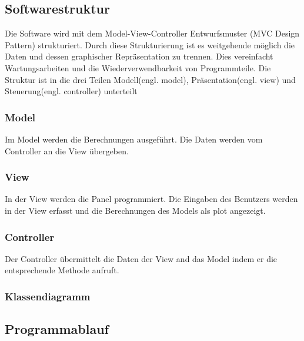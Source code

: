 \newpage

\subsection{Softwarestruktur} \label{subsec:softwarestruktur}

Die Software wird mit dem Model-View-Controller Entwurfsmuster (MVC Design Pattern) \cite{MVCDesignPattern} strukturiert. Durch diese Strukturierung ist es weitgehende möglich die Daten und dessen graphischer Repräsentation zu trennen. Dies vereinfacht Wartungsarbeiten und die Wiederverwendbarkeit von Programmteile. Die Struktur ist in die drei Teilen Modell(engl. model), Präsentation(engl. view) und Steuerung(engl. controller) unterteilt

\subsubsection{Model} \label{subsubsec:model}

Im Model werden die Berechnungen ausgeführt. Die Daten werden vom Controller an die View übergeben. 

\subsubsection{View} \label{subsubsec:model}

In der View werden die Panel programmiert. Die Eingaben des Benutzers werden in der View erfasst und die Berechnungen des Models als plot angezeigt.

\subsubsection{Controller} \label{subsubsec:model}

Der Controller übermittelt die Daten der View and das Model indem er die entsprechende Methode aufruft. 

\subsubsection{Klassendiagramm} \label{subsubsec:model}



\subsection{Programmablauf} \label{subsec:programmablauf}

